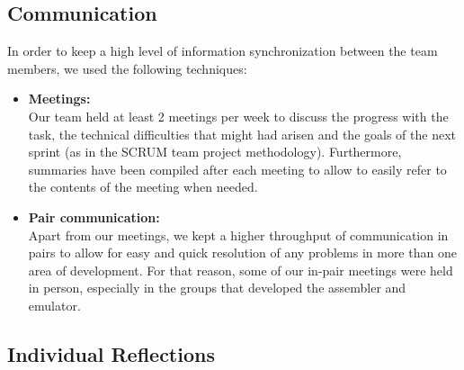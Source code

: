 \documentclass[11pt]{article}
\begin{document}
\subsection*{Communication}
In order to keep a high level of information synchronization between the team members, we used the following techniques:
\begin{itemize}
\item \textbf{Meetings:}\\
Our team held at least 2 meetings per week to discuss the progress with the task, the technical difficulties that might had arisen and the goals of the next sprint (as in the SCRUM team project methodology). Furthermore, summaries have been compiled after each meeting to allow to easily refer to the contents of the meeting when needed. 
\item \textbf{Pair communication:}\\
Apart from our meetings, we kept a higher throughput of communication in pairs to allow for easy and quick resolution of any problems in more than one area of development. For that reason, some of our in-pair meetings were held in person, especially in the groups that developed the assembler and emulator.
\end{itemize}
\subsection*{Individual Reflections}
\end{document}

